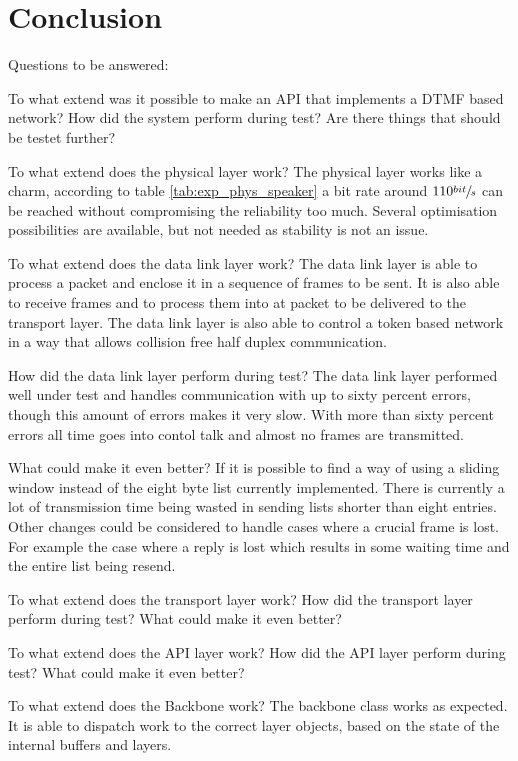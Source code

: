 \chapter{Conclusion}\label{chap:conclusion}
Questions to be answered:

To what extend was it possible to make an API that implements a DTMF based
network?
How did the system perform during test? 
Are there things that should be testet further?

To what extend does the physical layer work? 
The physical layer works like a charm, according to table \ref{tab:exp_phys_speaker} a bit rate around $110\sfrac{bit}{s}$ can be reached without compromising the reliability too much. Several optimisation possibilities are available, but not needed as stability is not an issue.

  To what extend does the data link layer work? 
The data link layer is able to process a packet and enclose it in a sequence of
frames to be sent. It is also able to receive frames and to process them into at
packet to be delivered to the transport layer. The data link layer is also able
to control a token based network in a way that allows collision free half duplex
communication. 

  How did the data link layer perform during test? The data link
layer performed well under test and handles communication with up to sixty
percent errors, though this amount of errors makes it very slow. With more than
sixty percent errors all time goes into contol talk and almost no frames are
transmitted.

  What could make it even better?
If it is possible to find a way of using a sliding window instead of the eight
byte list currently implemented. There is currently a lot of transmission time
being wasted in sending lists shorter than eight entries. Other changes could be
considered to handle cases where a crucial frame is lost. For example the case
where a reply is lost which results in some waiting time and the entire list
being resend.

To what extend does the transport layer work? 
How did the transport layer perform during test?
What could make it even better?

To what extend does the API layer work? 
How did the API layer perform during test?
What could make it even better?

To what extend does the Backbone work? 
The backbone class works as expected. It is able to dispatch work to the correct layer objects, based on the state of the internal buffers and layers.


